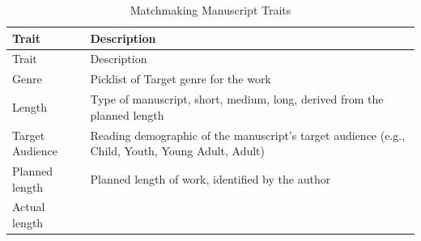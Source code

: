 \documentclass[11pt,openany]{book}
\begin{document}
\begin{longtable}[]{@{}ll@{}}
\caption{Matchmaking Manuscript Traits}\tabularnewline
\toprule
\begin{minipage}[b]{0.21\columnwidth}\raggedright
Trait\strut
\end{minipage} & \begin{minipage}[b]{0.73\columnwidth}\raggedright
Description\strut
\end{minipage}\tabularnewline
\midrule
\endfirsthead
\toprule
\begin{minipage}[b]{0.21\columnwidth}\raggedright
Trait\strut
\end{minipage} & \begin{minipage}[b]{0.73\columnwidth}\raggedright
Description\strut
\end{minipage}\tabularnewline
\midrule
\endhead
\begin{minipage}[t]{0.21\columnwidth}\raggedright
Genre\strut
\end{minipage} & \begin{minipage}[t]{0.73\columnwidth}\raggedright
Picklist of Target genre for the work\strut
\end{minipage}\tabularnewline
\begin{minipage}[t]{0.21\columnwidth}\raggedright
Length\strut
\end{minipage} & \begin{minipage}[t]{0.73\columnwidth}\raggedright
Type of manuscript, short, medium, long, derived from the planned
length\strut
\end{minipage}\tabularnewline
\begin{minipage}[t]{0.21\columnwidth}\raggedright
Target Audience\strut
\end{minipage} & \begin{minipage}[t]{0.73\columnwidth}\raggedright
Reading demographic of the manuscript's target audience (e.g., Child,
Youth, Young Adult, Adult)\strut
\end{minipage}\tabularnewline
\begin{minipage}[t]{0.21\columnwidth}\raggedright
Planned length\strut
\end{minipage} & \begin{minipage}[t]{0.73\columnwidth}\raggedright
Planned length of work, identified by the author\strut
\end{minipage}\tabularnewline
\begin{minipage}[t]{0.21\columnwidth}\raggedright
Actual length\strut
\end{minipage} & \begin{minipage}[t]{0.73\columnwidth}\raggedright

\end{minipage}
\end{longtable}
\end{document}
